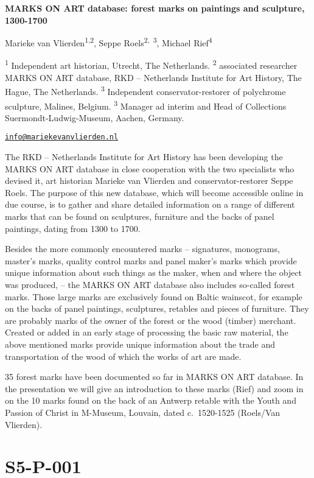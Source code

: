 \documentclass[
]{book}
\begin{document}
\textbf{MARKS ON ART database: forest marks on paintings and sculpture, 1300-1700}

Marieke van Vlierden\textsuperscript{1,2}, Seppe Roels\textsuperscript{2,~3}, Michael Rief\textsuperscript{4}

\textsuperscript{1} Independent art historian, Utrecht, The Netherlands. \textsuperscript{2} associated researcher MARKS ON ART database, RKD -- Netherlands Institute for Art History, The Hague, The Netherlands. \textsuperscript{3} Independent conservator-restorer of polychrome sculpture, Malines, Belgium. \textsuperscript{3} Manager ad interim and Head of Collections Suermondt-Ludwig-Museum, Aachen, Germany.

\href{mailto:info@mariekevanvlierden.nl}{\nolinkurl{info@mariekevanvlierden.nl}}

The RKD -- Netherlands Institute for Art History has been developing the MARKS ON ART database in close cooperation with the two specialists who devised it, art historian Marieke van Vlierden and conservator-restorer Seppe Roels. The purpose of this new database, which will become accessible online in due course, is to gather and share detailed information on a range of different marks that can be found on sculptures, furniture and the backs of panel paintings, dating from 1300 to 1700.

Besides the more commonly encountered marks -- signatures, monograms, master's marks, quality control marks and panel maker's marks which provide unique information about such things as the maker, when and where the object was produced, -- the MARKS ON ART database also includes so-called forest marks. Those large marks are exclusively found on Baltic wainscot, for example on the backs of panel paintings, sculptures, retables and pieces of furniture. They are probably marks of the owner of the forest or the wood (timber) merchant. Created or added in an early stage of processing the basic raw material, the above mentioned marks provide unique information about the trade and transportation of the wood of which the works of art are made.

35 forest marks have been documented so far in MARKS ON ART database. In the presentation we will give an introduction to these marks (Rief) and zoom in on the 10 marks found on the back of an Antwerp retable with the Youth and Passion of Christ in M-Museum, Louvain, dated c.~1520-1525 (Roels/Van Vlierden).

\hypertarget{s5-p-001}{%
\section*{S5-P-001}\label{s5-p-001}}
\end{document}
